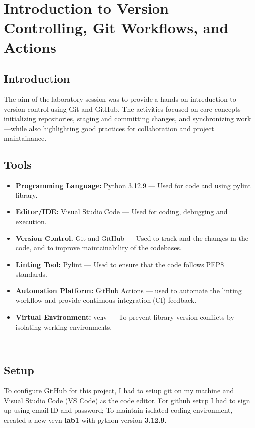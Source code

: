 \documentclass[12pt, a4paper]{report}
\begin{document}
\chapter{Introduction to Version Controlling, Git Workflows, and Actions}
\section{Introduction}

The aim of the laboratory session was to provide a hands-on introduction to version control using Git and GitHub. The activities focused on core concepts—initializing repositories, staging and committing changes, and synchronizing work—while also highlighting good practices for collaboration and project maintainance.
\
\section{Tools}

\begin{itemize}
    \item \textbf{Programming Language:} Python 3.12.9 --- Used for code and using pylint library.
    \item \textbf{Editor/IDE:} Visual Studio Code --- Used for coding, debugging and execution.
    \item \textbf{Version Control:} Git and GitHub --- Used to track and the changes in the code, and to improve maintainability of the codebases.
    \item \textbf{Linting Tool:} Pylint --- Used to ensure that the code follows PEP8 standards.
    \item \textbf{Automation Platform:} GitHub Actions --- used to automate the linting workflow and provide continuous integration (CI) feedback.
    \item \textbf{Virtual Environment:} venv --- To prevent library version conflicts by isolating working environments.
\end{itemize}

\
\section{Setup}

To configure GitHub for this project, I had to setup git on my machine and Visual Studio Code (VS Code) as the code editor. For github setup I had to sign up using email ID and password;
\newline 
To maintain isolated coding environment, created a new vevn \textbf{lab1} with python version \textbf{3.12.9}.
\end{document}
